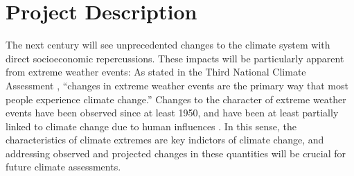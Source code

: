\documentclass[11pt]{article}
\begin{document}
\appendix

\addtocounter{section}{3}

 
\section{Project Description}

The next century will see unprecedented changes to the climate system with direct socioeconomic repercussions.  These impacts will be particularly apparent from extreme weather events: As stated in the Third National Climate Assessment \citep{ThirdNCA}, ``changes in extreme weather events are the primary way that most people experience climate change.''  Changes to the character of extreme weather events have been observed since at least 1950, and have been at least partially linked to climate change due to human influences \citep{IPCCAR5WGI}.  In this sense, the characteristics of climate extremes are key indictors of climate change, and addressing observed and projected changes in these quantities will be crucial for future climate assessments.
\end{document}
